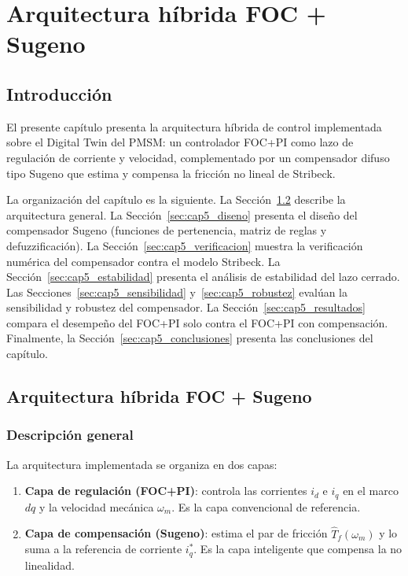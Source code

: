 \chapter{Arquitectura híbrida FOC + Sugeno}
\label{cap:resultados}

\section{Introducción}
\label{sec:cap5_intro}

El presente capítulo presenta la arquitectura híbrida de control implementada sobre el Digital Twin del PMSM: un controlador FOC+PI como lazo de regulación de corriente y velocidad, complementado por un compensador difuso tipo Sugeno que estima y compensa la fricción no lineal de Stribeck.

La organización del capítulo es la siguiente. La Sección~\ref{sec:cap5_arquitectura} describe la arquitectura general. La Sección~\ref{sec:cap5_diseno} presenta el diseño del compensador Sugeno (funciones de pertenencia, matriz de reglas y defuzzificación). La Sección~\ref{sec:cap5_verificacion} muestra la verificación numérica del compensador contra el modelo Stribeck. La Sección~\ref{sec:cap5_estabilidad} presenta el análisis de estabilidad del lazo cerrado. Las Secciones~\ref{sec:cap5_sensibilidad} y~\ref{sec:cap5_robustez} evalúan la sensibilidad y robustez del compensador. La Sección~\ref{sec:cap5_resultados} compara el desempeño del FOC+PI solo contra el FOC+PI con compensación. Finalmente, la Sección~\ref{sec:cap5_conclusiones} presenta las conclusiones del capítulo.

\section{Arquitectura híbrida FOC + Sugeno}
\label{sec:cap5_arquitectura}

\subsection{Descripción general}
\label{subsec:cap5_arquitectura_general}

La arquitectura implementada se organiza en dos capas:

\begin{enumerate}
  \item \textbf{Capa de regulación (FOC+PI)}: controla las corrientes $i_d$ e $i_q$ en el marco $dq$ y la velocidad mecánica $\omega_m$. Es la capa convencional de referencia.
  
  \item \textbf{Capa de compensación (Sugeno)}: estima el par de fricción $\hat{T}_f(\omega_m)$ y lo suma a la referencia de corriente $i_q^*$. Es la capa inteligente que compensa la no linealidad.
\end{enumerate}

